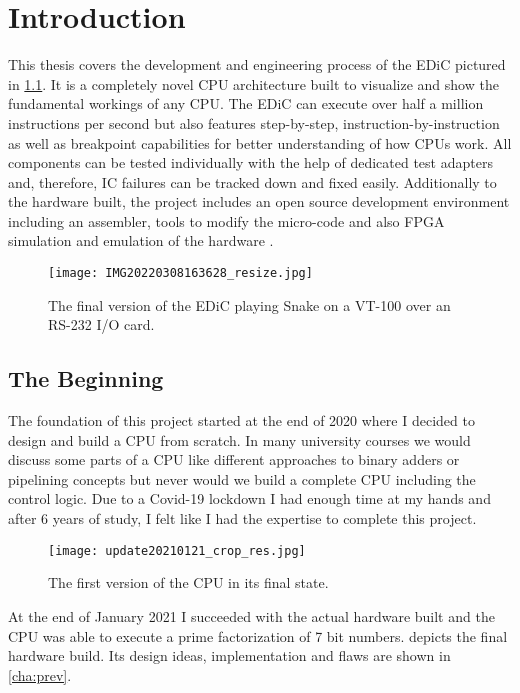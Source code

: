 \chapter{Introduction} \label{cha:intro}
This thesis covers the development and engineering process of the \gls{EDiC} pictured in \cref{fig:EDiCSnake}.
It is a completely novel \gls{CPU} architecture built to visualize and show the fundamental workings of any \gls{CPU}.
The \gls{EDiC} can execute over half a million instructions per second but also features step-by-step, instruction-by-instruction as well as breakpoint capabilities for better understanding of how \glspl{CPU} work.
All components can be tested individually with the help of dedicated test adapters and, therefore, \gls{IC} failures can be tracked down and fixed easily.
Additionally to the hardware built, the project includes an open source development environment including an assembler, tools to modify the micro-code and also \gls{FPGA} simulation and emulation of the hardware \cite{EDiCGitHub}.
\begin{figure}[t]
  \centering
  \texttt{[image: IMG20220308163628\_resize.jpg]}
  \caption{The final version of the \gls{EDiC} playing Snake on a VT-100 over an RS-232 I/O card.}
  \label{fig:EDiCSnake}
\end{figure}

\section{The Beginning}
The foundation of this project started at the end of 2020 where I decided to design and build a \gls{CPU} from scratch.
In many university courses we would discuss some parts of a \gls{CPU} like different approaches to binary adders or pipelining concepts but never would we build a complete \gls{CPU} including the control logic.
Due to a Covid-19 lockdown I had enough time at my hands and after 6 years of study, I felt like I had the expertise to complete this project.

\begin{figure}[t]
  \centering
  \texttt{[image: update20210121\_crop\_res.jpg]}
  \caption{The first version of the \gls{CPU} in its final state.}
  \label{fig:initialCPU}
\end{figure}
At the end of January 2021 I succeeded with the actual hardware built and the \gls{CPU} was able to execute a prime factorization of 7 bit numbers.
 depicts the final hardware build.
Its design ideas, implementation and flaws are shown in \cref{cha:prev}.

